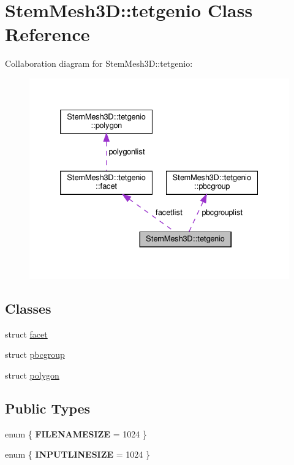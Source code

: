 \hypertarget{classStemMesh3D_1_1tetgenio}{}\section{Stem\+Mesh3D\+:\+:tetgenio Class Reference}
\label{classStemMesh3D_1_1tetgenio}


Collaboration diagram for Stem\+Mesh3D\+:\+:tetgenio\+:\nopagebreak
\begin{figure}[H]
\begin{center}
\leavevmode
\includegraphics[width=332pt]{classStemMesh3D_1_1tetgenio__coll__graph}
\end{center}
\end{figure}
\subsection*{Classes}
\begin{DoxyCompactItemize}
\item 
struct \hyperlink{structStemMesh3D_1_1tetgenio_1_1facet}{facet}
\item 
struct \hyperlink{structStemMesh3D_1_1tetgenio_1_1pbcgroup}{pbcgroup}
\item 
struct \hyperlink{structStemMesh3D_1_1tetgenio_1_1polygon}{polygon}
\end{DoxyCompactItemize}
\subsection*{Public Types}
\begin{DoxyCompactItemize}
\item 
\mbox{\label{classStemMesh3D_1_1tetgenio_aeb3b8945a91f73d771453de7760d523a}} 
enum \{ {\bfseries F\+I\+L\+E\+N\+A\+M\+E\+S\+I\+ZE} = 1024
 \}
\item 
\mbox{\label{classStemMesh3D_1_1tetgenio_a774bcf24d97d570a2a74d762a789b89e}} 
enum \{ {\bfseries I\+N\+P\+U\+T\+L\+I\+N\+E\+S\+I\+ZE} = 1024
 \}
\end{DoxyCompactItemize}
